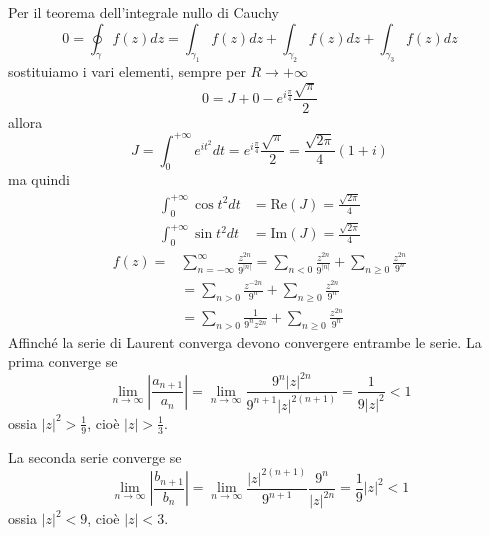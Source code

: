 Per il teorema dell'integrale nullo di Cauchy
\begin{equation*}
0=\oint\nolimits _{\gamma } f\left( z\right) dz=\int\nolimits _{\gamma _{1}} f\left( z\right) dz+\int\nolimits _{\gamma _{2}} f\left( z\right) dz+\int\nolimits _{\gamma _{3}} f\left( z\right) dz
\end{equation*}
sostituiamo i vari elementi, sempre per $R\rightarrow +\infty $
\begin{equation*}
0=J+0-e^{i\frac{\pi }{4}}\frac{\sqrt{\pi }}{2}
\end{equation*}
allora
\begin{equation*}
J=\int\nolimits ^{+\infty }_{0} e^{it^{2}} dt=e^{i\frac{\pi }{4}}\frac{\sqrt{\pi }}{2} =\frac{\sqrt{2\pi }}{4}\left( 1+i\right)
\end{equation*}
ma quindi
\begin{align*}
\int\nolimits ^{+\infty }_{0}\cos t^{2} dt & =\mathrm{Re}\left( J\right) =\frac{\sqrt{2\pi }}{4}\\
\int\nolimits ^{+\infty }_{0}\sin t^{2} dt & =\mathrm{Im}\left( J\right) =\frac{\sqrt{2\pi }}{4}
\end{align*}
\Soluzione
\begin{align*}
f\left( z\right) = & \sum\limits ^{\infty }_{n=-\infty }\frac{z^{2n}}{9^{\left| n\right| }} =\sum _{n< 0}\frac{z^{2n}}{9^{\left| n\right| }} +\sum _{n\geqslant 0}\frac{z^{2n}}{9^{n}}\\
 & =\sum _{n >0}\frac{z^{-2n}}{9^{n}} +\sum _{n\geqslant 0}\frac{z^{2n}}{9^{n}}\\
 & =\sum _{n >0}\frac{1}{9^{n} z^{2n}} +\sum _{n\geqslant 0}\frac{z^{2n}}{9^{n}}
\end{align*}
Affinché la serie di Laurent converga devono convergere entrambe le serie. La prima converge se
\begin{equation*}
\lim\limits _{n\rightarrow \infty }\left| \frac{a_{n+1}}{a_{n}}\right| =\lim\limits _{n\rightarrow \infty }\frac{9^{n}\left| z\right| ^{2n}}{9^{n+1}\left| z\right| ^{2\left( n+1\right)}} =\frac{1}{9\left| z\right| ^{2}} < 1
\end{equation*}
ossia $\left| z\right| ^{2}  >\frac{1}{9}$, cioè $\left| z\right|  >\frac{1}{3}$.

La seconda serie converge se
\begin{equation*}
\lim\limits _{n\rightarrow \infty }\left| \frac{b_{n+1}}{b_{n}}\right| =\lim\limits _{n\rightarrow \infty }\frac{\left| z\right| ^{2\left( n+1\right)}}{9^{n+1}}\frac{9^{n}}{\left| z\right| ^{2n}} =\frac{1}{9}\left| z\right| ^{2} < 1
\end{equation*}
ossia $\left| z\right| ^{2} < 9$, cioè $\left| z\right| < 3$.

